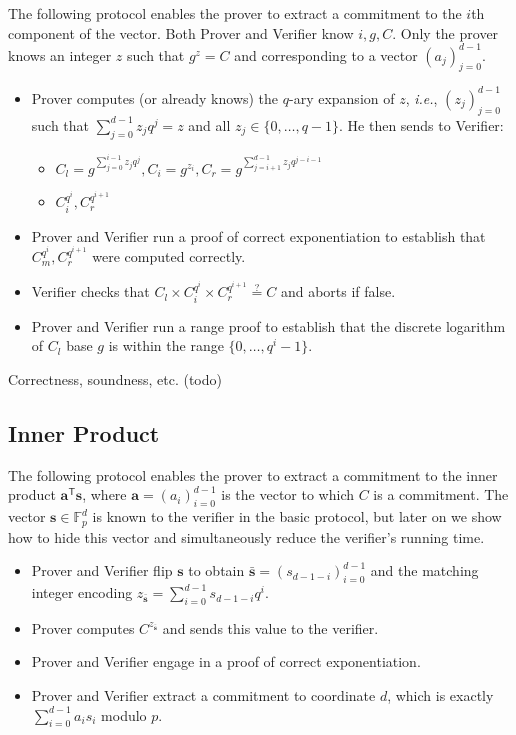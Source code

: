 \documentclass{article}
\begin{document}
The following protocol enables the prover to extract a commitment to the $i$th component of the vector. Both Prover and Verifier know $i, g, C$. Only the prover knows an integer $z$ such that $g^z = C$ and corresponding to a vector $(a_j)_{j=0}^{d-1}$.
\begin{itemize}
\item Prover computes (or already knows) the $q$-ary expansion of $z$, \emph{i.e.}, $(z_j)_{j=0}^{d-1}$ such that $\sum_{j=0}^{d-1} z_j q^j = z$ and all $z_j \in \{0,\ldots, q-1\}$. He then sends to Verifier:
\begin{itemize}
\item $C_l = g^{\sum_{j=0}^{i-1} z_jq^j}, C_i = g^{z_i}, C_r = g^{\sum_{j=i+1}^{d-1} z_j q^{j-i-1}}$
\item $C_i^{q^i}, C_r^{q^{i+1}}$
\end{itemize}
\item Prover and Verifier run a proof of correct exponentiation to establish that $C_m^{q^i}, C_r^{q^{i+1}}$ were computed correctly.
\item Verifier checks that $C_l \times C_i^{q^i} \times C_r^{q^{i+1}} \stackrel{?}{=} C$ and aborts if false.
\item Prover and Verifier run a range proof to establish that the discrete logarithm of $C_l$ base $g$ is within the range $\{0, \ldots, q^i-1\}$.
\end{itemize}

Correctness, soundness, etc. (todo)

\subsection{Inner Product}
\label{section:inner_product}

The following protocol enables the prover to extract a commitment to the inner product $\mathbf{a}^\mathsf{T} \mathbf{s}$, where $\mathbf{a} = (a_i)_{i=0}^{d-1}$ is the vector to which $C$ is a commitment. The vector $\mathbf{s} \in \mathbb{F}_p^d$ is known to the verifier in the basic protocol, but later on we show how to hide this vector and simultaneously reduce the verifier's running time.
\begin{itemize}
\item Prover and Verifier flip $\mathbf{s}$ to obtain $\bar{\mathbf{s}} = (s_{d-1-i})_{i=0}^{d-1}$ and the matching integer encoding $z_{\bar{\mathbf{s}}} = \sum_{i=0}^{d-1} s_{d-1-i} q^i$.
\item Prover computes $C^{z_{\bar{\mathbf{s}}}}$ and sends this value to the verifier.
\item Prover and Verifier engage in a proof of correct exponentiation.
\item Prover and Verifier extract a commitment to coordinate $d$, which is exactly $\sum_{i=0}^{d-1} a_is_i$ modulo $p$.
\end{itemize}
\end{document}
